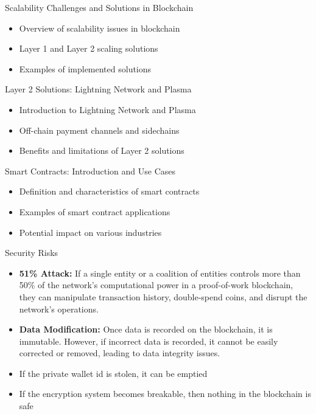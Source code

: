 \begin{frame}{Scalability Challenges and Solutions in Blockchain}
    \begin{itemize}
        \item Overview of scalability issues in blockchain
        \item Layer 1 and Layer 2 scaling solutions
        \item Examples of implemented solutions
    \end{itemize}
\end{frame}

\begin{frame}{Layer 2 Solutions: Lightning Network and Plasma}
    \begin{itemize}
        \item Introduction to Lightning Network and Plasma
        \item Off-chain payment channels and sidechains
        \item Benefits and limitations of Layer 2 solutions
    \end{itemize}
\end{frame}

\begin{frame}{Smart Contracts: Introduction and Use Cases}
    \begin{itemize}
        \item Definition and characteristics of smart contracts
        \item Examples of smart contract applications
        \item Potential impact on various industries
    \end{itemize}
\end{frame}

\begin{frame}{Security Risks}
    \begin{itemize}
        \item \textbf{51\% Attack:} If a single entity or a coalition of entities controls more than 50\% of the network's computational power in a proof-of-work blockchain, they can manipulate transaction history, double-spend coins, and disrupt the network's operations.
        \item \textbf{Data Modification:} Once data is recorded on the blockchain, it is immutable. However, if incorrect data is recorded, it cannot be easily corrected or removed, leading to data integrity issues.
        \item If the private wallet id is stolen, it can be emptied
        \item If the encryption system becomes breakable, then nothing in the blockchain is safe
    \end{itemize}
\end{frame}

